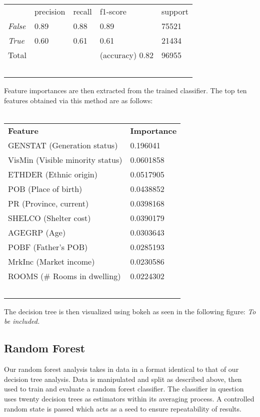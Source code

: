 \documentclass[10pt, conference, compsocconf]{IEEEtran}
\begin{document}
\begin{tabular}{lllll}
                              & precision & recall & f1-score        & support \\
\textit{False}         & 0.89      & 0.88   & 0.89            & 75521   \\
\textit{True} & 0.60      & 0.61   & 0.61            & 21434   \\
Total                       &           &        & (accuracy) 0.82 & 96955   \\\
\end{tabular}

Feature importances are then extracted from the trained classifier.  The top ten features obtained via this method are as follows:\\\

\begin{tabular}{ll}
\textbf{Feature} & \textbf{Importance} \\
GENSTAT (Generation status)         & 0.196041            \\
VisMin (Visible minority status)          & 0.0601858           \\
ETHDER (Ethnic origin)          & 0.0517905           \\
POB (Place of birth)             & 0.0438852           \\
PR (Province, current)              & 0.0398168           \\
SHELCO (Shelter cost)          & 0.0390179           \\
AGEGRP (Age)          & 0.0303643           \\
POBF (Father's POB)            & 0.0285193           \\
MrkInc (Market income)          & 0.0230586           \\
ROOMS (\# Rooms in dwelling)           & 0.0224302   \\\       
\end{tabular}

The decision tree is then visualized using bokeh as seen in the following figure: \textit{To be included.}

\subsection{Random Forest}

Our random forest analysis takes in data in a format identical to that of our decision tree analysis.  Data is manipulated and split as described above, then used to train and evaluate a random forest classifier.  The classifier in question uses twenty decision trees as estimators within its averaging process.  A controlled random state is passed which acts as a seed to ensure repeatability of results.
\end{document}
